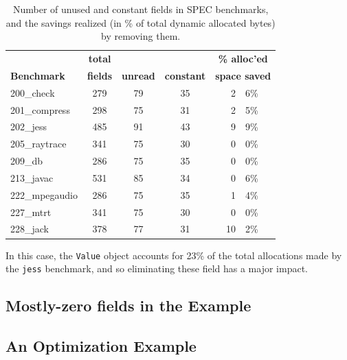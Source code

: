 \documentclass[preprint]{acmconf}
\begin{document}
\begin{table}
\begin{tabular}{lcccr@{.}l}
&\bf total&&&\multicolumn{2}{c}{\bf\% alloc'ed}\\
\bf Benchmark &\bf fields &\bf unread &\bf constant &
\multicolumn{2}{c}{\bf space saved} \\\hline
200\_check      & 279 &   79   &   35   &  2&6\% \\
201\_compress   & 298 &   75   &   31   &  2&5\% \\
202\_jess       & 485 &   91   &   43   &  9&9\% \\
205\_raytrace   & 341 &   75   &   30   &  0&0\% \\
209\_db         & 286 &   75   &   35   &  0&0\% \\
213\_javac      & 531 &   85   &   34   &  0&6\% \\
222\_mpegaudio  & 286 &   75   &   35   &  1&4\% \\
227\_mtrt       & 341 &   75   &   30   &  0&0\% \\
228\_jack       & 378 &   77   &   31   & 10&2\% \\
\end{tabular}
\caption{Number of unused and constant fields in SPEC benchmarks,
  and the savings realized (in \% of total dynamic allocated bytes) by
  removing them.}
\label{tab:const-unused}
\end{table}

In this case, the {\tt Value} object accounts for 23\% of the total
allocations made by the {\tt jess} benchmark, and so eliminating these
field has a major impact.

\subsection{Mostly-zero fields in the Example}
\subsection{An Optimization Example}

\end{document}
